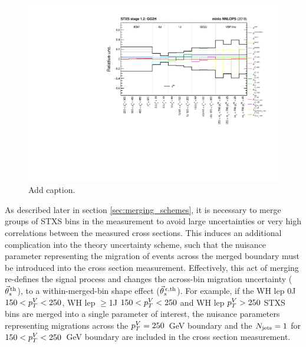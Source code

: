 \begin{figure}[hptb]
  \centering
  \includegraphics[width=1\textwidth]{Figures/hgg_stats/ggH_theoryunc_scheme.pdf}
  \caption[The ggH theory uncertainty scheme]
  {
    Add caption.
  }
  \label{fig:systematics_sigshape}
\end{figure}


As described later in section \ref{sec:merging_schemes}, it is necessary to merge groups of STXS bins in the measurement to avoid large uncertainties or very high correlations between the measured cross sections. This induces an additional complication into the theory uncertainty scheme, such that the nuisance parameter representing the migration of events across the merged boundary must be introduced into the cross section measurement. Effectively, this act of merging re-defines the signal process and changes the across-bin migration uncertainty ($\vec{\theta}^{\,\rm{th}}_{s}$), to a within-merged-bin shape effect ($\vec{\theta}^{\,\epsilon,{\rm{th}}}_{s}$). For example, if the WH lep 0J $150<p_T^V<250$, WH lep $\geq$1J $150<p_T^V<250$ and WH lep $p_T^V>250$ STXS bins are merged into a single parameter of interest, the nuisance parameters representing migrations across the $p_T^V=250$~GeV boundary and the $N_{\rm{jets}}=1$ for $150<p_T^V<250$~GeV boundary are included in the cross section measurement.




